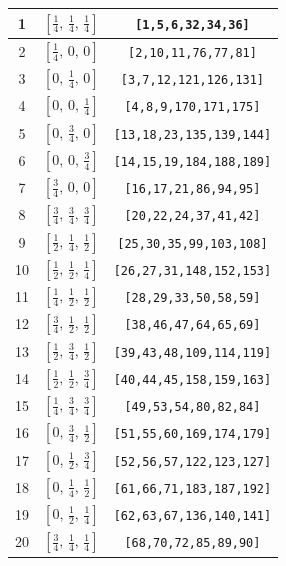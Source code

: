 \documentclass[fleqn,8pt]{jsarticle}
\begin{document}
\begin{longtable}{ccc}
1 & $\left[ \frac{1}{4},\, \frac{1}{4},\, \frac{1}{4} \right]$ & {\tt [1,5,6,32,34,36]} \\ \hline
2 & $\left[ \frac{1}{4},\, 0,\, 0 \right]$ & {\tt [2,10,11,76,77,81]} \\ \hline
3 & $\left[ 0,\, \frac{1}{4},\, 0 \right]$ & {\tt [3,7,12,121,126,131]} \\ \hline
4 & $\left[ 0,\, 0,\, \frac{1}{4} \right]$ & {\tt [4,8,9,170,171,175]} \\ \hline
5 & $\left[ 0,\, \frac{3}{4},\, 0 \right]$ & {\tt [13,18,23,135,139,144]} \\ \hline
6 & $\left[ 0,\, 0,\, \frac{3}{4} \right]$ & {\tt [14,15,19,184,188,189]} \\ \hline
7 & $\left[ \frac{3}{4},\, 0,\, 0 \right]$ & {\tt [16,17,21,86,94,95]} \\ \hline
8 & $\left[ \frac{3}{4},\, \frac{3}{4},\, \frac{3}{4} \right]$ & {\tt [20,22,24,37,41,42]} \\ \hline
9 & $\left[ \frac{1}{2},\, \frac{1}{4},\, \frac{1}{2} \right]$ & {\tt [25,30,35,99,103,108]} \\ \hline
10 & $\left[ \frac{1}{2},\, \frac{1}{2},\, \frac{1}{4} \right]$ & {\tt [26,27,31,148,152,153]} \\ \hline
11 & $\left[ \frac{1}{4},\, \frac{1}{2},\, \frac{1}{2} \right]$ & {\tt [28,29,33,50,58,59]} \\ \hline
12 & $\left[ \frac{3}{4},\, \frac{1}{2},\, \frac{1}{2} \right]$ & {\tt [38,46,47,64,65,69]} \\ \hline
13 & $\left[ \frac{1}{2},\, \frac{3}{4},\, \frac{1}{2} \right]$ & {\tt [39,43,48,109,114,119]} \\ \hline
14 & $\left[ \frac{1}{2},\, \frac{1}{2},\, \frac{3}{4} \right]$ & {\tt [40,44,45,158,159,163]} \\ \hline
15 & $\left[ \frac{1}{4},\, \frac{3}{4},\, \frac{3}{4} \right]$ & {\tt [49,53,54,80,82,84]} \\ \hline
16 & $\left[ 0,\, \frac{3}{4},\, \frac{1}{2} \right]$ & {\tt [51,55,60,169,174,179]} \\ \hline
17 & $\left[ 0,\, \frac{1}{2},\, \frac{3}{4} \right]$ & {\tt [52,56,57,122,123,127]} \\ \hline
18 & $\left[ 0,\, \frac{1}{4},\, \frac{1}{2} \right]$ & {\tt [61,66,71,183,187,192]} \\ \hline
19 & $\left[ 0,\, \frac{1}{2},\, \frac{1}{4} \right]$ & {\tt [62,63,67,136,140,141]} \\ \hline
20 & $\left[ \frac{3}{4},\, \frac{1}{4},\, \frac{1}{4} \right]$ & {\tt [68,70,72,85,89,90]} \\ \hline

\end{longtable}
\end{document}

